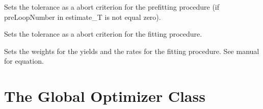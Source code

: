 \documentclass[letterpaper,10pt,english]{sphinxmanual}
\begin{document}
\begin{fulllineitems}
\begin{fulllineitems}
\end{fulllineitems}


\begin{fulllineitems}
\label{FittingClasses:Fitter.LeastSquarsEstimator.setPreTolerance}
Sets the tolerance as a abort criterion for the prefitting procedure (if preLoopNumber in estimate\_T is not equal zero).

\end{fulllineitems}


\begin{fulllineitems}
\label{FittingClasses:Fitter.LeastSquarsEstimator.setTolerance}
Sets the tolerance as a abort criterion for the fitting procedure.

\end{fulllineitems}


\begin{fulllineitems}
\label{FittingClasses:Fitter.LeastSquarsEstimator.setWeights}
Sets the weights for the yields and the rates for the fitting procedure. See manual for equation.

\end{fulllineitems}


\end{fulllineitems}



\section{The Global Optimizer Class}
\label{FittingClasses:the-global-optimizer-class}
\end{document}
